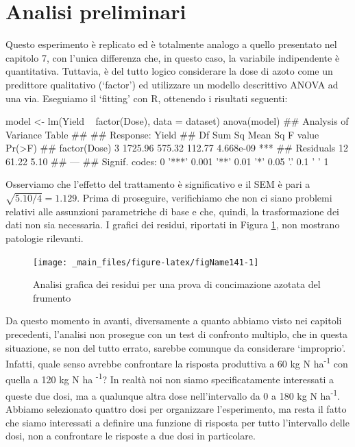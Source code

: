 \documentclass[a4paper,12pt,oneside]{book}
\newenvironment{Shaded}{}{}
\newcommand{\KeywordTok}[1]{#1}
\newcommand{\DataTypeTok}[1]{#1}
\newcommand{\StringTok}[1]{#1}
\newcommand{\CommentTok}[1]{#1}
\newcommand{\OperatorTok}[1]{#1}
\newcommand{\NormalTok}[1]{#1}
\begin{document}
\hypertarget{analisi-preliminari}{%
\section{Analisi preliminari}\label{analisi-preliminari}}

Questo esperimento è replicato ed è totalmente analogo a quello presentato nel capitolo 7, con l'unica differenza che, in questo caso, la variabile indipendente è quantitativa. Tuttavia, è del tutto logico considerare la dose di azoto come un predittore qualitativo (`factor') ed utilizzare un modello descrittivo ANOVA ad una via. Eseguiamo il `fitting' con R, ottenendo i risultati seguenti:

\begin{Shaded}
\begin{Highlighting}[]
\NormalTok{model <-}\StringTok{ }\KeywordTok{lm}\NormalTok{(Yield }\OperatorTok{~}\StringTok{ }\KeywordTok{factor}\NormalTok{(Dose), }\DataTypeTok{data =}\NormalTok{ dataset)}
\KeywordTok{anova}\NormalTok{(model)}
\CommentTok{## Analysis of Variance Table}
\CommentTok{## }
\CommentTok{## Response: Yield}
\CommentTok{##              Df  Sum Sq Mean Sq F value    Pr(>F)    }
\CommentTok{## factor(Dose)  3 1725.96  575.32  112.77 4.668e-09 ***}
\CommentTok{## Residuals    12   61.22    5.10                      }
\CommentTok{## ---}
\CommentTok{## Signif. codes:  0 '***' 0.001 '**' 0.01 '*' 0.05 '.' 0.1 ' ' 1}
\end{Highlighting}
\end{Shaded}

Osserviamo che l'effetto del trattamento è significativo e il SEM è pari a \(\sqrt{5.10/4} = 1.129\). Prima di proseguire, verifichiamo che non ci siano problemi relativi alle assunzioni parametriche di base e che, quindi, la trasformazione dei dati non sia necessaria. I grafici dei residui, riportati in Figura \ref{fig:figName141}, non mostrano patologie rilevanti.

\begin{figure}

{\centering \texttt{[image: \_main\_files/figure-latex/figName141-1]} 

}

\caption{Analisi grafica dei residui per una prova di concimazione azotata del frumento}\label{fig:figName141}
\end{figure}

Da questo momento in avanti, diversamente a quanto abbiamo visto nei capitoli precedenti, l'analisi non prosegue con un test di confronto multiplo, che in questa situazione, se non del tutto errato, sarebbe comunque da considerare `improprio'. Infatti, quale senso avrebbe confrontare la risposta produttiva a 60 kg N ha\textsuperscript{-1} con quella a 120 kg N ha \textsuperscript{-1}? In realtà noi non siamo specificatamente interessati a queste due dosi, ma a qualunque altra dose nell'intervallo da 0 a 180 kg N ha\textsuperscript{-1}. Abbiamo selezionato quattro dosi per organizzare l'esperimento, ma resta il fatto che siamo interessati a definire una funzione di risposta per tutto l'intervallo delle dosi, non a confrontare le risposte a due dosi in particolare.
\end{document}

